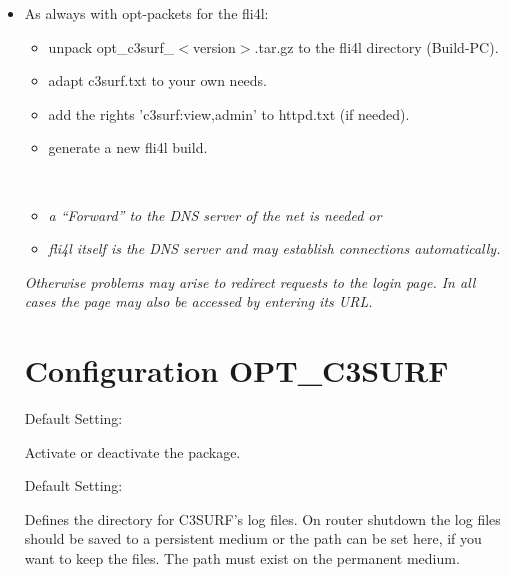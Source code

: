 \begin{itemize}
\item As always with opt-packets for the fli4l:
  \begin{itemize}
     \item unpack opt\_c3surf\_$<$version$>$.tar.gz to the fli4l directory (Build-PC).
     \item adapt c3surf.txt to your own needs.
     \item add the rights 'c3surf:view,admin' to httpd.txt (if needed).
     \item generate a new fli4l build.\\
\end{itemize}
\\
          \begin{itemize}
                \item \emph{a ``Forward'' to the DNS server of the net is needed or}
                \item \emph{fli4l itself is the DNS server and may establish connections automatically.}
          \end{itemize}

	\emph{Otherwise problems may arise to redirect requests to the login page. In all cases the
	page may also be accessed by entering its URL.}

\section {Configuration OPT\_C3SURF}
\begin{description}


  Default Setting: 

  Activate or deactivate the package.


  Default Setting: 

  Defines the directory for C3SURF's log files. On router shutdown
  the log files should be saved to a persistent medium or the path
  can be set here, if you want to keep the files. The path must exist
  on the permanent medium.



\end{description}
\end{itemize}
